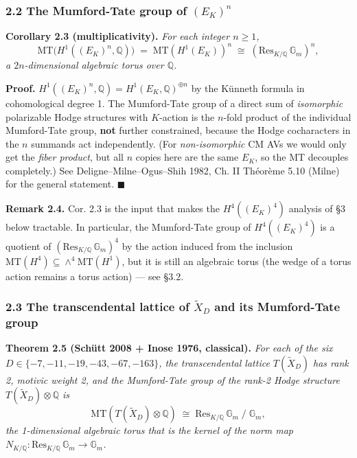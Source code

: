 \documentclass[
  11pt,
  a4paper,
]{article}
\begin{document}
\hypertarget{the-mumford-tate-group-of-e_kn}{%
\subsubsection{\texorpdfstring{2.2 The Mumford-Tate group of \((E_K)^n\)}{2.2 The Mumford-Tate group of (E\_K)\^{}n}}\label{the-mumford-tate-group-of-e_kn}}

\textbf{Corollary 2.3 (multiplicativity).} \emph{For each integer \(n \geq 1\),}
\[
\mathrm{MT}\bigl(H^1((E_K)^n, \mathbb{Q})\bigr) \;=\; \mathrm{MT}(H^1(E_K))^n \;\cong\; (\mathrm{Res}_{K/\mathbb{Q}}\,\mathbb{G}_m)^n,
\]
\emph{a \(2n\)-dimensional algebraic torus over \(\mathbb{Q}\).}

\textbf{Proof.} \(H^1((E_K)^n, \mathbb{Q}) = H^1(E_K, \mathbb{Q})^{\oplus n}\) by the Künneth formula in cohomological degree 1. The Mumford-Tate group of a direct sum of \emph{isomorphic} polarizable Hodge structures with \(K\)-action is the \(n\)-fold product of the individual Mumford-Tate group, \textbf{not} further constrained, because the Hodge cocharacters in the \(n\) summands act independently. (For \emph{non-isomorphic} CM AVs we would only get the \emph{fiber product}, but all \(n\) copies here are the same \(E_K\), so the MT decouples completely.) See Deligne--Milne--Ogus--Shih 1982, Ch. II Théorème 5.10 (Milne) for the general statement. \(\blacksquare\)

\textbf{Remark 2.4.} Cor. 2.3 is the input that makes the \(H^4((E_K)^4)\) analysis of §3 below tractable. In particular, the Mumford-Tate group of \(H^4((E_K)^4)\) is a quotient of \((\mathrm{Res}_{K/\mathbb{Q}}\,\mathbb{G}_m)^4\) by the action induced from the inclusion \(\mathrm{MT}(H^4) \subseteq \wedge^4 \mathrm{MT}(H^1)\), but it is still an algebraic torus (the wedge of a torus action remains a torus action) --- see §3.2.

\hypertarget{the-transcendental-lattice-of-widetildex_d-and-its-mumford-tate-group}{%
\subsubsection{\texorpdfstring{2.3 The transcendental lattice of \(\widetilde{X}_D\) and its Mumford-Tate group}{2.3 The transcendental lattice of \textbackslash widetilde\{X\}\_D and its Mumford-Tate group}}\label{the-transcendental-lattice-of-widetildex_d-and-its-mumford-tate-group}}

\textbf{Theorem 2.5 (Schütt 2008 + Inose 1976, classical).} \emph{For each of the six \(D \in \{-7, -11, -19, -43, -67, -163\}\), the transcendental lattice \(T(\widetilde{X}_D)\) has rank 2, motivic weight 2, and the Mumford-Tate group of the rank-2 Hodge structure \(T(\widetilde{X}_D) \otimes \mathbb{Q}\) is}
\[
\mathrm{MT}(T(\widetilde{X}_D) \otimes \mathbb{Q}) \;\cong\; \mathrm{Res}_{K/\mathbb{Q}}\,\mathbb{G}_m \;/\; \mathbb{G}_m,
\]
\emph{the 1-dimensional algebraic torus that is the kernel of the norm map \(N_{K/\mathbb{Q}} : \mathrm{Res}_{K/\mathbb{Q}}\,\mathbb{G}_m \to \mathbb{G}_m\).}
\end{document}
